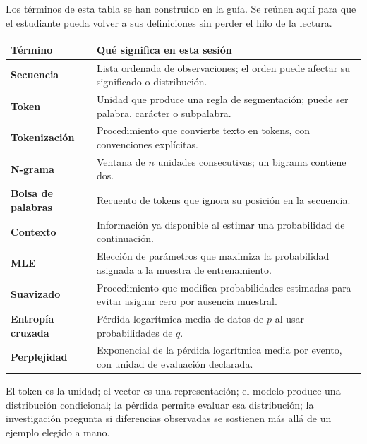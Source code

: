 Los términos de esta tabla se han construido en la guía. Se reúnen aquí para que el estudiante pueda volver a sus definiciones sin perder el hilo de la lectura.
\begin{center}
\begin{tabularx}{\textwidth}{>{\bfseries}p{37mm}X}\toprule
Término & Qué significa en esta sesión \\\midrule
Secuencia & Lista ordenada de observaciones; el orden puede afectar su significado o distribución.\\
Token & Unidad que produce una regla de segmentación; puede ser palabra, carácter o subpalabra.\\
Tokenización & Procedimiento que convierte texto en tokens, con convenciones explícitas.\\
N-grama & Ventana de $n$ unidades consecutivas; un bigrama contiene dos.\\
Bolsa de palabras & Recuento de tokens que ignora su posición en la secuencia.\\
Contexto & Información ya disponible al estimar una probabilidad de continuación.\\
MLE & Elección de parámetros que maximiza la probabilidad asignada a la muestra de entrenamiento.\\
Suavizado & Procedimiento que modifica probabilidades estimadas para evitar asignar cero por ausencia muestral.\\
Entropía cruzada & Pérdida logarítmica media de datos de $p$ al usar probabilidades de $q$.\\
Perplejidad & Exponencial de la pérdida logarítmica media por evento, con unidad de evaluación declarada.\\\bottomrule
\end{tabularx}
\end{center}
\begin{idea}
El token es la unidad; el vector es una representación; el modelo produce una distribución condicional; la pérdida permite evaluar esa distribución; la investigación pregunta si diferencias observadas se sostienen más allá de un ejemplo elegido a mano.
\end{idea}
\clearpage






\label{s01:lab:mat}

